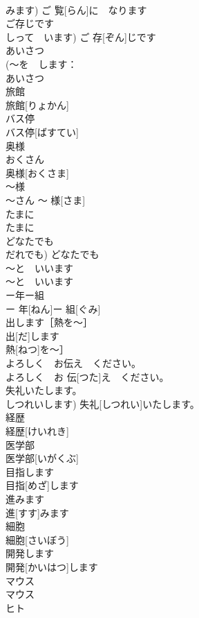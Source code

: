 \documentclass[8pt]{extreport}
\begin{document}
\begin{CJK}{UTF8}{min}
\\	みます)	ご 覧[らん]に　なります	
\\	ご存じです	
\\	しって　います)	ご 存[ぞん]じです	
\\	あいさつ	
\\	(〜を　します：
\\	あいさつ	
\\	旅館	
\\	旅館[りょかん]	
\\	バス停	
\\	バス停[ばすてい]	
\\	奥様	
\\	おくさん
\\	奥様[おくさま]	
\\	〜様	
\\	〜さん	〜 様[さま]	
\\	たまに	
\\	たまに	
\\	どなたでも	
\\	だれでも)	どなたでも	
\\	〜と　いいます	
\\	〜と　いいます	
\\	ー年ー組	
\\	ー 年[ねん]ー 組[ぐみ]	
\\	出します［熱を〜］	
\\	出[だ]します
\\	熱[ねつ]を〜］	
\\	よろしく　お伝え　ください。	
\\	よろしく　お 伝[つた]え　ください。	
\\	失礼いたします。	
\\	しつれいします)	失礼[しつれい]いたします。	
\\	経歴	
\\	経歴[けいれき]	
\\	医学部	
\\	医学部[いがくぶ]	
\\	目指します	
\\	目指[めざ]します	
\\	進みます	
\\	進[すす]みます	
\\	細胞	
\\	細胞[さいぼう]	
\\	開発します	
\\	開発[かいはつ]します	
\\	マウス	
\\	マウス	
\\	ヒト	

\end{CJK}
\end{document}
